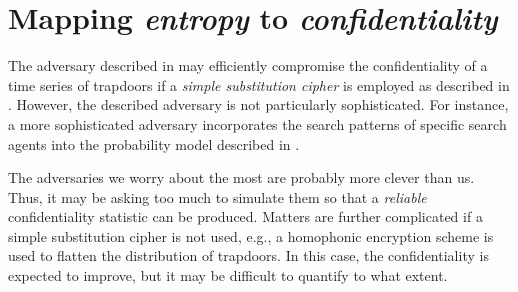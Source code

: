 \documentclass[ ../main.tex]{subfiles}
\begin{document}
\section{Mapping \emph{entropy} to \emph{confidentiality}}
\label{sec:sophisticated}
The adversary described in  may efficiently compromise the confidentiality of a time series of trapdoors if a \emph{simple substitution cipher} is employed as described in . However, the described adversary is not particularly sophisticated. For instance, a more sophisticated adversary incorporates the search patterns of specific search agents into the probability model described in .

The adversaries we worry about the most are probably more clever than us. Thus, it may be asking too much to simulate them so that a \emph{reliable} confidentiality statistic can be produced. Matters are further complicated if a simple substitution cipher is not used, e.g., a homophonic encryption scheme is used to flatten the distribution of trapdoors. In this case, the confidentiality is expected to improve, but it may be difficult to quantify to what extent.
\end{document}

